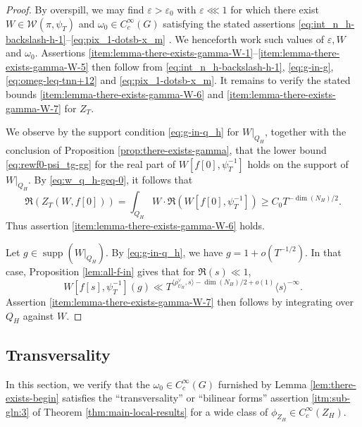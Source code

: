 \documentclass[reqno]{amsart}
\def\eps{\varepsilon}
\DeclareMathOperator{\supp}{supp}
\theoremstyle{plain} \newtheorem{theorem} {Theorem}
\theoremstyle{definition} \newtheorem{definition} [theorem] {Definition}
\theoremstyle{itplain} %
\numberwithin{equation}{section}
\numberwithin{theorem}{section}
\renewcommand{\geq}{\geqslant}
\begin{document}
\begin{proof}
  By overspill, we may find $\eps > \eps_0$ with $\eps \lll 1$ for which there exist $W \in \mathcal{W}(\pi,\psi_T)$ and $\omega_0 \in C_c^\infty(G)$ satisfying the stated assertions \eqref{eq:int_n_h-backslash-h-1}--\eqref{eq:pix_1-dotsb-x_m} .  We henceforth work such values of $\eps, W$ and $\omega_0$.  Assertions \eqref{item:lemma-there-exists-gamma-W-1}--\eqref{item:lemma-there-exists-gamma-W-5} then follow from \eqref{eq:int_n_h-backslash-h-1}, \eqref{eq:g-in-g}, \eqref{eq:omeg-leq-tnn+12} and \eqref{eq:pix_1-dotsb-x_m}.  It remains to verify the stated bounds \eqref{item:lemma-there-exists-gamma-W-6} and \eqref{item:lemma-there-exists-gamma-W-7} for $Z_T$.

  We observe by the support condition \eqref{eq:g-in-q_h} for $W|_{Q_H}$, together with the conclusion of Proposition \ref{prop:there-exists-gamma}, that the lower bound \eqref{eq:rewf0-psi_tg-gg} for the real part of $W[f[0],\psi_T^{-1}]$ holds on the support of $W|_{Q_H}$.  By \eqref{eq:w_q_h-geq-0}, it follows that
  \begin{equation*}
    \Re(Z_T(W,f[0]))
    =
    \int _{Q_H}
    W \cdot \Re(W[f[0],\psi_T^{-1}])
    \geq C_0 T^{-\dim(N_H) / 2}.
  \end{equation*}
  Thus assertion \eqref{item:lemma-there-exists-gamma-W-6} holds.

  Let $g \in \supp(W|_{Q_H})$.  By \eqref{eq:g-in-q_h}, we have $g = 1 + o(T^{-1/2})$.  In that case, Proposition \ref{lem:all-f-in} gives that for $\Re(s) \ll 1$,
  \begin{equation}
    W[f[s], \psi_T^{-1}](g) \ll T ^{\langle \rho_{U_H}^\vee, s \rangle - \dim(N_H)/2 + o(1)} \langle s \rangle ^{-\infty }.
  \end{equation}
  Assertion \eqref{item:lemma-there-exists-gamma-W-7} then follows by integrating over $Q_H$ against $W$.
\end{proof}




\subsection{Transversality}
In this section, we verify that the $\omega_0 \in C_c^\infty(G)$ furnished by Lemma \ref{lem:there-exists-begin} satisfies the ``transversality'' or ``bilinear forms'' assertion \eqref{itm:sub-gln:3} of Theorem \ref{thm:main-local-results} for a wide class of $\phi_{Z_H} \in C_c^\infty(Z_H)$.
\end{document}
